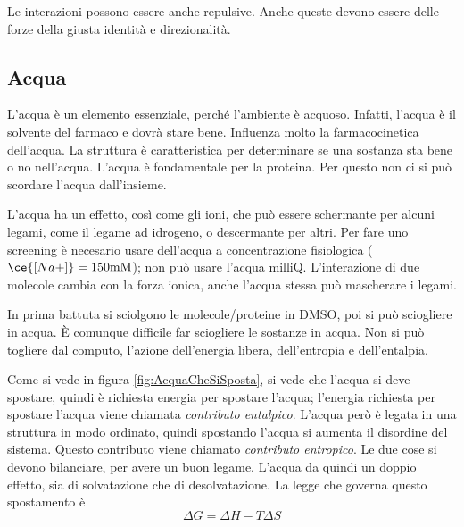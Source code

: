 Le interazioni possono essere anche repulsive. Anche queste devono
essere delle forze della giusta identità e direzionalità.


\subsection{Acqua}

L'acqua è un elemento essenziale, perché l'ambiente è acquoso.
Infatti, l'acqua è il solvente del farmaco e dovrà stare bene. Influenza molto la
farmacocinetica dell'acqua. La struttura è caratteristica per
determinare se una sostanza sta bene o no nell'acqua.
L'acqua è fondamentale per la proteina. Per questo non ci si può
scordare l'acqua dall'insieme.

L'acqua ha un effetto, così come gli ioni, che può essere schermante per alcuni legami, come il legame ad idrogeno, o descermante per altri.
Per fare uno screening è necesario usare dell'acqua a concentrazione fisiologica ($\ce{[Na+]} = 150 \text{mM}$); non può usare l'acqua milliQ.
L'interazione di due molecole cambia con la forza ionica, anche l'acqua
stessa può mascherare i legami.

In prima battuta si sciolgono le molecole/proteine in DMSO, poi si può
sciogliere in acqua. È comunque difficile far sciogliere le sostanze in
acqua.
Non si può togliere dal computo, l'azione dell'energia libera,
dell'entropia e dell'entalpia.


Come si vede in figura \ref{fig:AcquaCheSiSposta}, si vede che l'acqua si deve spostare, quindi è richiesta energia per spostare l'acqua; l'energia richiesta per spostare l'acqua viene chiamata \emph{contributo entalpico}. L'acqua però è legata in una struttura in modo ordinato, quindi spostando l'acqua si aumenta il disordine del sistema. Questo contributo viene chiamato \emph{contributo entropico}.
Le due cose si devono bilanciare, per avere un buon legame. L'acqua da
quindi un doppio effetto, sia di solvatazione che di desolvatazione.
La legge che governa questo spostamento è
\[
\Delta G = \Delta H - T \Delta S
\]

